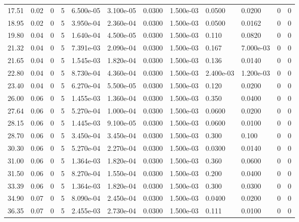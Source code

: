 \documentclass[preview]{standalone}
\begin{document}
{{\begin{tabular}{L{1.2cm}C{1.2cm} C{0.3cm}C{0.5cm} C{1.4cm}C{1.4cm} C{1.4cm}C{1.4cm} C{1.6cm}C{1.6cm} C{1.6cm}C{1.6cm}}
  17.51  &  0.02  & 0     &  5 &  6.500e-05  & 3.100e-05  &  0.0300&   1.500e-03& 0.0500 & 0.0200   &  0 & 0  \\ 
  18.95  &  0.02  & 0     &  5 &  3.950e-04  & 2.360e-04  &  0.0300&   1.500e-03& 0.0500 & 0.0162   &  0 & 0  \\ 
  19.80  &  0.04  & 0     &  5 &  1.640e-04  & 4.500e-05  &  0.0300&   1.500e-03& 0.110 & 0.0820   &  0 & 0  \\ 
  21.32  &  0.04  & 0     &  5 &  7.391e-03  & 2.090e-04  &  0.0300&   1.500e-03& 0.167 & 7.000e-03   &  0 & 0  \\ 
  21.65  &  0.04  & 0     &  5 &  1.545e-03  & 1.820e-04  &  0.0300&   1.500e-03& 0.136 & 0.0140   &  0 & 0  \\ 
  22.80  &  0.04  & 0     &  5 &  8.730e-04  & 4.360e-04  &  0.0300&   1.500e-03& 2.400e-03 & 1.200e-03   &  0 & 0  \\ 
  23.40  &  0.04  & 0     &  5 &  6.270e-04  & 5.500e-05  &  0.0300&   1.500e-03& 0.120 & 0.0200   &  0 & 0  \\ 
  26.00  &  0.06  & 0     &  5 &  1.455e-03  & 1.360e-04  &  0.0300&   1.500e-03& 0.350 & 0.0400   &  0 & 0  \\ 
  27.64  &  0.06  & 0     &  5 &  5.270e-04  & 1.000e-04  &  0.0300&   1.500e-03& 0.0600 & 0.0200   &  0 & 0  \\ 
  28.15  &  0.06  & 0     &  5 &  1.445e-03  & 9.100e-05  &  0.0300&   1.500e-03& 0.0600 & 0.0100   &  0 & 0  \\ 
  28.70  &  0.06  & 0     &  5 &  3.450e-04  & 3.450e-04  &  0.0300&   1.500e-03& 0.300 & 0.100   &  0 & 0  \\ 
  30.30  &  0.06  & 0     &  5 &  5.270e-04  & 2.270e-04  &  0.0300&   1.500e-03& 0.0300 & 0.0140   &  0 & 0  \\ 
  31.00  &  0.06  & 0     &  5 &  1.364e-03  & 1.820e-04  &  0.0300&   1.500e-03& 0.360 & 0.0600   &  0 & 0  \\ 
  31.50  &  0.06  & 0     &  5 &  8.270e-04  & 1.550e-04  &  0.0300&   1.500e-03& 0.200 & 0.0400   &  0 & 0  \\ 
  33.39  &  0.06  & 0     &  5 &  1.364e-03  & 1.820e-04  &  0.0300&   1.500e-03& 0.300 & 0.0300   &  0 & 0  \\ 
  34.90  &  0.07  & 0     &  5 &  8.090e-04  & 2.450e-04  &  0.0300&   1.500e-03& 0.0400 & 0.0200   &  0 & 0  \\ 
  36.35  &  0.07  & 0     &  5 &  2.455e-03  & 2.730e-04  &  0.0300&   1.500e-03& 0.111 & 0.0100   &  0 & 0  \\ 

\end{tabular}}}
\end{document}
